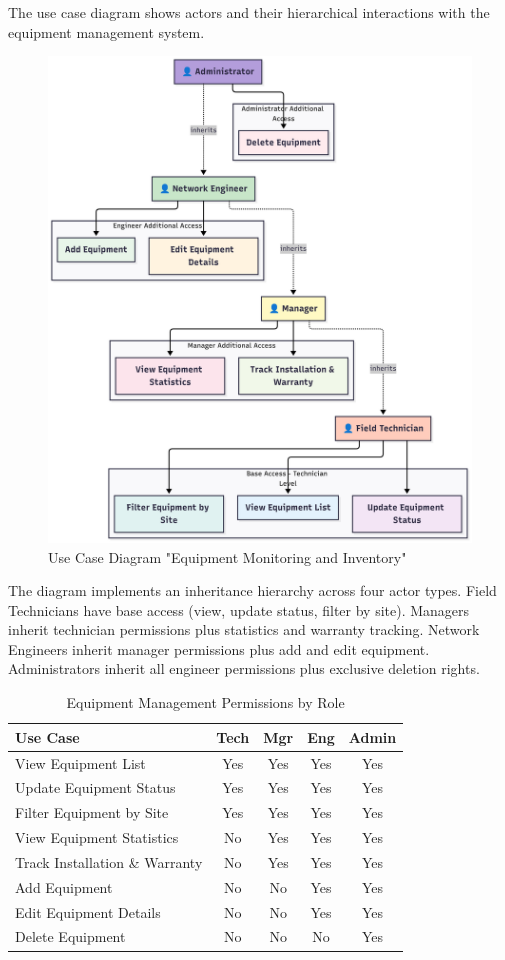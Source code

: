 The use case diagram shows actors and their hierarchical interactions with the equipment management system.

\begin{figure}[H]
    \centering
    \includegraphics[width=0.75\linewidth]{img/chap_04/equipment_usecase_diagram.png}
    \caption{Use Case Diagram "Equipment Monitoring and Inventory"}
    \label{fig:use_case_diagram_sprint2}
\end{figure}

The diagram implements an inheritance hierarchy across four actor types. Field Technicians have base access (view, update status, filter by site). Managers inherit technician permissions plus statistics and warranty tracking. Network Engineers inherit manager permissions plus add and edit equipment. Administrators inherit all engineer permissions plus exclusive deletion rights.

\begin{table}[H]
\centering
\caption{Equipment Management Permissions by Role}
\label{tab:equipment-permissions}
\small
\begin{tabular}{|p{3.5cm}|c|c|c|c|}
\hline
\textbf{Use Case} & \textbf{Tech} & \textbf{Mgr} & \textbf{Eng} & \textbf{Admin} \\
\hline
View Equipment List & Yes & Yes & Yes & Yes \\
\hline
Update Equipment Status & Yes & Yes & Yes & Yes \\
\hline
Filter Equipment by Site & Yes & Yes & Yes & Yes \\
\hline
View Equipment Statistics & No & Yes & Yes & Yes \\
\hline
Track Installation \& Warranty & No & Yes & Yes & Yes \\
\hline
Add Equipment & No & No & Yes & Yes \\
\hline
Edit Equipment Details & No & No & Yes & Yes \\
\hline
Delete Equipment & No & No & No & Yes \\
\hline
\end{tabular}
\end{table}

